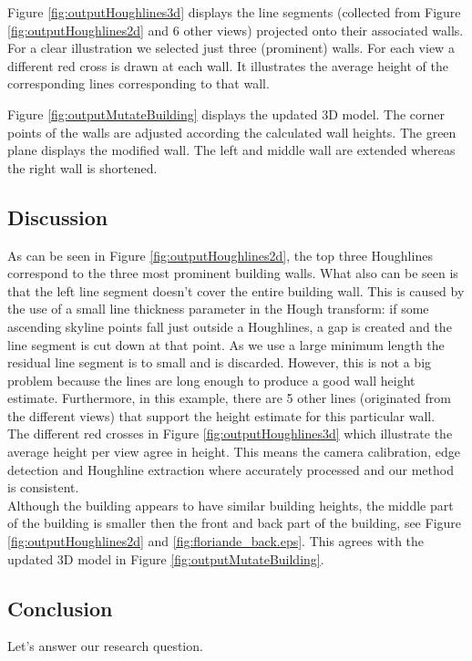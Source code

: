 Figure \ref{fig:outputHoughlines3d} displays the line segments (collected from
Figure \ref{fig:outputHoughlines2d} and 6 other views) projected onto their associated walls.
For a clear illustration we selected just three (prominent) walls.
For each view a different red cross is drawn at each wall. It illustrates the
average height of the corresponding lines corresponding to that wall.
 
Figure \ref{fig:outputMutateBuilding} displays the updated 3D model. The corner
points of the walls are adjusted according the calculated wall heights.  The
green plane displays the modified wall. The left and middle wall are extended
whereas the right wall is shortened.\\


\subsection{Discussion}
As can be seen in Figure \ref{fig:outputHoughlines2d}, 
the top three Houghlines correspond to the three most prominent building walls.
What also can be seen is that the left line segment doesn't cover the entire
building wall. This is caused by the use of
a small line thickness parameter
in the Hough transform: if some ascending skyline points fall just outside
a Houghlines, a gap is created and the line segment is cut down at that point.
As we use a large minimum length the residual line segment is to small and is
discarded.  However, this is not a big problem because the lines are long enough to produce a
good wall height estimate. Furthermore, in this example, there are 5 other lines
(originated from the different views) that support the height estimate for this
particular wall.\\

The different red crosses in Figure \ref{fig:outputHoughlines3d} which illustrate the average height per view 
agree in height. This means the camera calibration, edge detection and Houghline
extraction where accurately processed and our method is consistent. \\

Although the building appears to have similar building heights, the middle part
of the building is smaller then the front and back part of the building, see
Figure \ref{fig:outputHoughlines2d} and \ref{fig:floriande_back.eps}.
This agrees with the updated 3D model in Figure \ref{fig:outputMutateBuilding}.

\newpage
\subsection{Conclusion}
Let's answer our research question.

